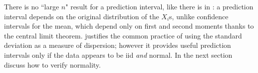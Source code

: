 %
%
%
%
%
%
%
%
%

There is no ``large $n$" result for a prediction interval, like
there is in : a prediction interval depends
on the original distribution of the $X_i$s, unlike confidence
intervals for the mean, which depend only on first and second
moments thanks to the central limit theorem.
 justifies the common practice of using
the standard deviation as a measure of dispersion; however it
provides useful prediction intervals only if the data appears
to be iid \emph{and} normal. In the next section discuss how to
verify normality.

